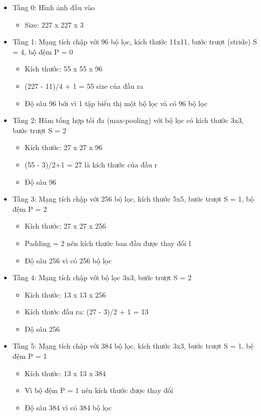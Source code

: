 \begin{itemize}
\item Tầng 0: Hình ảnh đầu vào
\begin{itemize}
\item Size: 227 x 227 x 3
\end{itemize}
\item Tầng 1: Mạng tích chập với 96 bộ lọc, kích thước 11x11, bước trượt (stride) S = 4, bộ đệm P = 0
\begin{itemize}
\item Kích thước: 55 x 55 x 96
\item (227 - 11)/4 + 1 = 55 size của đầu ra
\item Độ sâu 96 bởi vì 1 tập biểu thị một bộ lọc và có 96 bộ lọc
\end{itemize}
\item Tầng 2: Hàm tổng hợp tối đa (max-pooling) với bộ lọc có kích thước 3x3, bước trượt S = 2
\begin{itemize}
\item Kích thước: 27 x 27 x 96
\item (55 - 3)/2+1 = 27 là kích thước của đầu r
\item Độ sâu 96
\end{itemize}
\item Tầng 3: Mạng tích chập với 256 bộ lọc, kích thước 5x5, bước trượt S = 1, bộ đệm P = 2
\begin{itemize}
\item Kích thước: 27 x 27 x 256
\item Padding = 2 nên kích thước ban đầu được thay đổi l
\item Độ sâu 256 vì có 256 bộ lọc
\end{itemize}
\item Tầng 4: Mạng tích chập với bộ lọc 3x3, bước trượt S = 2
\begin{itemize}
\item Kích thước: 13 x 13 x 256
\item Kích thước đầu ra: (27 - 3)/2 + 1 = 13
\item Độ sâu 256
\end{itemize}
\item Tầng 5: Mạng tích chập với 384 bộ lọc, kích thước 3x3, bước trượt S = 1, bệ đệm P = 1
\begin{itemize}
\item Kích thước: 13 x 13 x 384
\item Vì bộ đệm P = 1 nên kích thước được thay đổi
\item Độ sâu 384 vì có 384 bộ lọc

\end{itemize}
\end{itemize}
